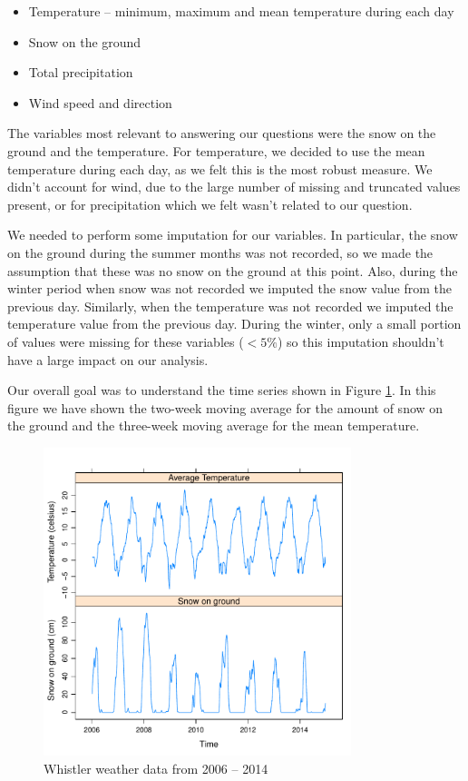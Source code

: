 \documentclass[12pt,twoside]{article}
\begin{document}
{\begin{itemize}
\item Temperature -- minimum, maximum and mean temperature during each day
\item Snow on the ground 
\item Total precipitation 
\item Wind speed and direction
\end{itemize}

\medskip\noindent The variables most relevant to answering our questions were the snow on the ground and the temperature. For temperature, we decided to use the mean temperature during each day, as we felt this is the most robust measure. We didn't account for wind, due to the large number of missing and truncated values present, or for precipitation which we felt wasn't related to our question. 

We needed to perform some imputation for our variables. In particular, the snow on the ground during the summer months was not recorded, so we made the assumption that these was no snow on the ground at this point. Also, during the winter period when snow was not recorded we imputed the snow value from the previous day. Similarly, when the temperature was not recorded we imputed the temperature value from the previous day. During the winter, only a small portion of values were missing for these variables ($<5\%$) so this imputation shouldn't have a large impact on our analysis.

Our overall goal was to understand the time series shown in Figure \ref{fig:basicts}. In this figure we have shown the two-week moving average for the amount of snow on the ground and the three-week moving average for the mean temperature.


\begin{figure}[!ht]
\begin{center}
\includegraphics[width=0.8\textwidth]{report-basicts}
\end{center}
\vspace{-5mm}
\caption{Whistler weather data from 2006 -- 2014}
\label{fig:basicts}
\end{figure}

}
\end{document}

